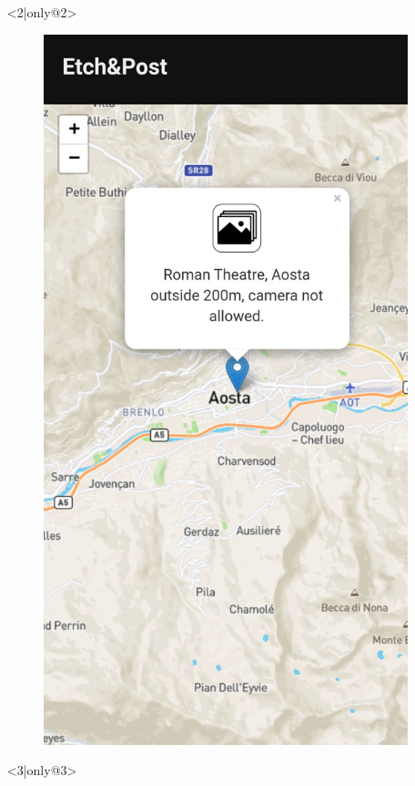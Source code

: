 \documentclass{beamer}
\begin{document}
\begin{frame}
\begin{columns}
\begin{itemize}
\begin{figure}[!h]
 		\end{figure}
 	\item[] <2|only@2> 
		\begin{figure}[!h]
 			\centering
 			\includegraphics[scale=0.1]{"Immagini/galleria.jpg"}
 		\end{figure}
 	\item[] <3|only@3> 

\end{itemize}
\end{columns}
\end{frame}
\end{document}
